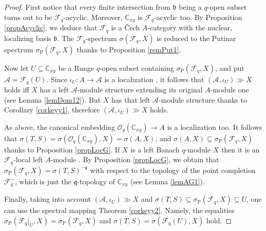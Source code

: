 \documentclass[12pt]{amsart}%
\theoremstyle{plain}
\numberwithin{equation}{section}
\numberwithin{equation}{section}
\numberwithin{theorem}{section}
\numberwithin{lemma}{section}
\numberwithin{remark}{section}
\numberwithin{example}{section}
\numberwithin{proposition}{section}
\numberwithin{definition}{section}
\numberwithin{corollary}{section}
\begin{document}
\begin{proof}
First notice that every finite intersection from $\mathfrak{b}$ being a
$q$-open subset turns out to be $\mathcal{F}_{q}$-acyclic. Moreover,
$\mathbb{C}_{xy}$ is $\mathcal{F}_{q}$-acyclic too. By Proposition
\ref{propAcyclic}, we deduce that $\mathcal{F}_{q}$ is a \v{C}ech $A$-category
with the nuclear, localizing basis $\mathfrak{b}$. The $\mathcal{F}_{q}%
$-spectrum $\sigma\left(  \mathcal{F}_{q},X\right)  $ is reduced to the
Putinar spectrum $\sigma_{\operatorname{P}}\left(  \mathcal{F}_{q},X\right)  $
thanks to Proposition \ref{remPut1}.

Now let $U\subseteq\mathbb{C}_{xy}$ be a Runge $q$-open subset containing
$\sigma_{\operatorname{P}}\left(  \mathcal{F}_{q},X\right)  $, and put
$\mathcal{A=F}_{q}\left(  U\right)  $. Since $\iota_{U}:A\rightarrow
\mathcal{A}$ is a localization \cite{DosiLoc}, it follows that $\left(
\mathcal{A},\iota_{U}\right)  \gg X$ holds iff $X$ has a left $\mathcal{A}%
$-module structure extending its original $A$-module one (see Lemma
\ref{lemDom12}). But $X$ has that left $\mathcal{A}$-module structure thanks
to Corollary \ref{corkeyy1}, therefore $\left(  \mathcal{A},\iota_{U}\right)
\gg X$ holds.

As above, the canonical embedding $\mathcal{O}_{q}\left(  \mathbb{C}%
_{xy}\right)  \rightarrow A$ is a localization too. It follows that
$\sigma\left(  T,S\right)  =\sigma\left(  \mathcal{O}_{q}\left(
\mathbb{C}_{xy}\right)  ,X\right)  =\sigma\left(  A,X\right)  $, and
$\sigma\left(  A,X\right)  \subseteq\sigma_{\operatorname{P}}\left(
\mathcal{F}_{q},X\right)  $ thanks to Proposition \ref{propLocG}. If $X$ is a
left Banach $q$-module $X$ then it is an $\mathcal{F}_{q}$\textit{-}local left
$A$-module \cite[Theorem 6.5]{Dosi25}. By Proposition \ref{propLocG}, we
obtain that $\sigma_{\operatorname{P}}\left(  \mathcal{F}_{q},X\right)
=\sigma\left(  T,S\right)  ^{-\mathfrak{q}}$ with respect to the topology of
the point completion $\mathcal{F}_{q}^{\sim}$, which is just the
$\mathfrak{q}$-topology of $\mathbb{C}_{xy}$ (see Lemma \ref{lemAG1}).

Finally, taking into account $\left(  \mathcal{A},\iota_{U}\right)  \gg X$ and
$\sigma\left(  T,S\right)  \subseteq\sigma_{\operatorname{P}}\left(
\mathcal{F}_{q},X\right)  \subseteq U$, one can use the spectral mapping
Theorem \ref{corkeyy2}. Namely, the equalities $\sigma_{\operatorname{P}%
}\left(  \mathcal{F}_{q}|_{U},X\right)  =\sigma_{\operatorname{P}}\left(
\mathcal{F}_{q},X\right)  $ and $\sigma\left(  T,S\right)  =\sigma\left(
\mathcal{F}_{q}\left(  U\right)  ,X\right)  $ hold.
\end{proof}
\end{document}
